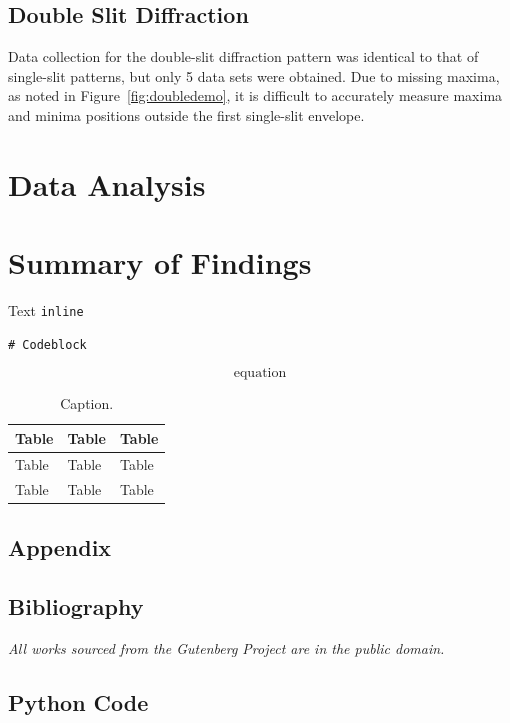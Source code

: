 \documentclass[a4paper]{article}
\begin{document}
\subsection{Double Slit Diffraction}

Data collection for the double-slit diffraction pattern was identical to that of single-slit patterns, but only 5 data sets were obtained. Due to missing maxima, as noted in Figure~\ref{fig:doubledemo}, it is difficult to accurately measure maxima and minima positions outside the first single-slit envelope.

\section{Data Analysis}

\section{Summary of Findings}

Text \lstinline$inline$
\begin{lstlisting}
# Codeblock
\end{lstlisting}
\begin{equation}
\text{equation}
\end{equation}



\begin{table}[h!]
\centering
\begin{tabular}{lll}
\hline
Table & Table & Table\\ \hline
Table & Table & Table \\
Table & Table & Table \\
\end{tabular}
\caption{\label{tab:table}Caption.}
\end{table}
\newpage
\begin{appendix}
\section{Appendix}
\subsection{Bibliography}
\emph{All works sourced from the Gutenberg Project are in the public domain.}


\subsection{Python Code}\label{sec:python}

\end{appendix}
\end{document}

